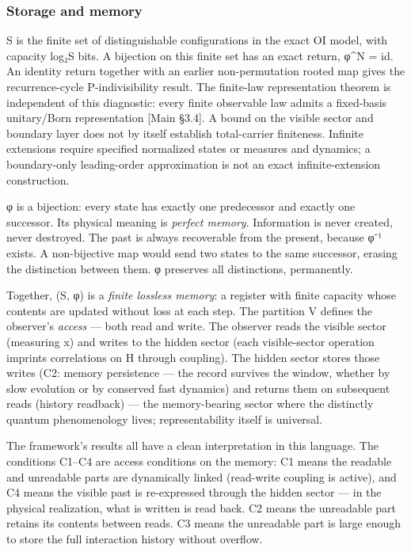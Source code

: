 \documentclass[
]{article}
\begin{document}
\hypertarget{storage-and-memory}{%
\subsubsection{Storage and memory}\label{storage-and-memory}}

S is the finite set of distinguishable configurations in the exact OI
model, with capacity log₂\textbar S\textbar{} bits. A bijection on this
finite set has an exact return, φ\^{}N = id. An identity return together
with an earlier non-permutation rooted map gives the recurrence-cycle
P-indivisibility result. The finite-law representation theorem is
independent of this diagnostic: every finite observable law admits a
fixed-basis unitary/Born representation {[}Main §3.4{]}. A bound on the
visible sector and boundary layer does not by itself establish
total-carrier finiteness. Infinite extensions require specified
normalized states or measures and dynamics; a boundary-only
leading-order approximation is not an exact infinite-extension
construction.

φ is a bijection: every state has exactly one predecessor and exactly
one successor. Its physical meaning is \emph{perfect memory}.
Information is never created, never destroyed. The past is always
recoverable from the present, because φ⁻¹ exists. A non-bijective map
would send two states to the same successor, erasing the distinction
between them. φ preserves all distinctions, permanently.

Together, (S, φ) is a \emph{finite lossless memory}: a register with
finite capacity whose contents are updated without loss at each step.
The partition V defines the observer's \emph{access} --- both read and
write. The observer reads the visible sector (measuring x) and writes to
the hidden sector (each visible-sector operation imprints correlations
on H through coupling). The hidden sector stores those writes (C2:
memory persistence --- the record survives the window, whether by slow
evolution or by conserved fast dynamics) and returns them on subsequent
reads (history readback) --- the memory-bearing sector where the
distinctly quantum phenomenology lives; representability itself is
universal.

The framework's results all have a clean interpretation in this
language. The conditions C1--C4 are access conditions on the memory: C1
means the readable and unreadable parts are dynamically linked
(read-write coupling is active), and C4 means the visible past is
re-expressed through the hidden sector --- in the physical realization,
what is written is read back. C2 means the unreadable part retains its
contents between reads. C3 means the unreadable part is large enough to
store the full interaction history without overflow.
\end{document}
